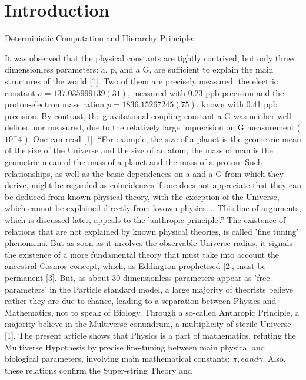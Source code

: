 
\chapter{Introduction}

Deterministic Computation and Hierarchy Principle:
\begin{center}
It was observed that the physical constants are tightly contrived, but only three dimensionless
parameters: a, p, and a G, are sufficient to explain the main structures of the world [1]. Two of them
are precisely measured: the electric constant $a = 137.035999139(31)$, measured with 0.23 ppb
precision and the proton-electron mass ration $p = 1836.15267245(75)$, known with 0.41 ppb
precision. By contrast, the gravitational coupling constant a G was neither well defined nor
measured, due to the relatively large imprecision on G measurement ($10^-4$ ).
One can read [1]: “For example, the size of a planet is the geometric mean of the size of the
Universe and the size of an atom; the mass of man is the geometric mean of the mass of a planet
and the mass of a proton. Such relationships, as well as the basic dependences on a and a G from
which they derive, might be regarded as coincidences if one does not appreciate that they can be
deduced from known physical theory, with the exception of the Universe, which cannot be explained
directly from kwown physics.... This line of arguments, which is discussed later, appeals to the
'anthropic principle'.”
The existence of relations that are not explained by known physical theories, is called 'fine
tuning' phenomena. But as soon as it involves the observable Universe radius, it signals the
existence of a more fundamental theory that must take into account the ancestral Cosmos concept,
which, as Eddington prophetised [2], must be permanent [3].
But, as about 30 dimensionless parameters appear as 'free parameters' in the Particle standard
model, a large majority of theorists believe rather they are due to chance, leading to a separation
between Physics and Mathematics, not to speak of Biology. Through a so-called Anthropic
Principle, a majority believe in the Multiverse conundrum, a multiplicity of sterile Universe [1].
The present article shows that Physics is a part of mathematics, refuting the Multiverse
Hypothesis by precise fine-tuning between main physical and biological parameters, involving
main mathematical constants: $\pi, e and \gamma $. Also, these relations confirm the Super-string Theory and

\end{center}
